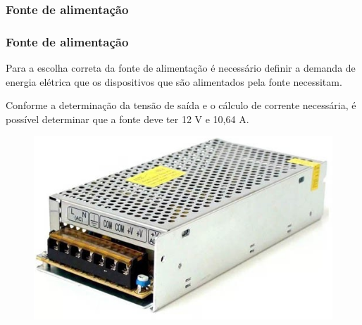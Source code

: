 \subsubsection{Fonte de alimentação}

\begin{frame}
\frametitle{Fonte de alimentação}

Para a escolha correta da fonte de alimentação é necessário definir a demanda de energia elétrica que os dispositivos que são alimentados pela fonte necessitam.

Conforme a determinação da tensão de saída e o cálculo de corrente necessária, é possível determinar que a fonte deve ter 12 V e 10,64 A.

\begin{figure}
\centering
\includegraphics[scale = 0.5]{figs/fonte}
\end{figure}

\end{frame}
